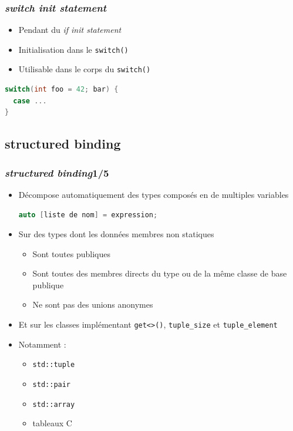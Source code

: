 \documentclass[C++.tex]{subfiles}
\begin{document}
\begin{frame}[fragile]
	\frametitle{\textit{switch init statement}}
	\begin{itemize}
		\item Pendant du \textit{if init statement}
		\item Initialisation dans le \lstinline|switch()|
		\item Utilisable dans le corps du \lstinline|switch()|
	\end{itemize}

	\begin{lstlisting}[language=C++]
switch(int foo = 42; bar) {
  case ...
}\end{lstlisting}
\end{frame}

\subsection*{structured binding}
\begin{frame}[fragile]
	\frametitle{\textit{structured binding}\titlehfill{}1/5}
	\begin{itemize}
		\item Décompose automatiquement des types composés en de multiples variables

		\begin{lstlisting}[language=C++]
auto [liste de nom] = expression;\end{lstlisting}

		\item Sur des types dont les données membres non statiques
		\begin{itemize}
			\item Sont toutes publiques
			\item Sont toutes des membres directs du type ou de la même classe de base publique
			\item Ne sont pas des unions anonymes
		\end{itemize}

		\item Et sur les classes implémentant \lstinline|get<>()|, \lstinline|tuple_size| et \lstinline|tuple_element|	
		
		\item Notamment : 
		\begin{itemize}
			\item \lstinline|std::tuple|
			\item \lstinline|std::pair|
			\item \lstinline|std::array|
			\item tableaux C
		\end{itemize}
	\end{itemize}
\end{frame}
\end{document}
